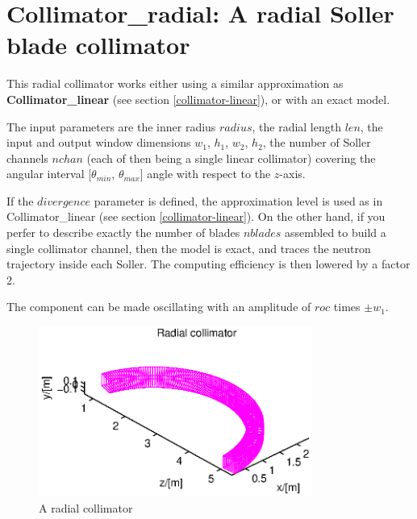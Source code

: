 \section{Collimator\_radial: A radial Soller blade collimator}


This radial collimator works either using a similar approximation as 
{\bf Collimator\_linear} (see section \ref{collimator-linear}), 
or with an exact model.

The input parameters are the inner radius $radius$, the radial length $len$, 
the input and output window dimensions $w_1$, $h_1$, $w_2$, $h_2$, 
the number of Soller channels $nchan$ 
(each of then being a single linear collimator) covering the angular interval
[$\theta_{min}$, $\theta_{max}$] angle with respect to the $z$-axis.

If the $divergence$ parameter is defined, 
the approximation level is used as in {\rm Collimator\_linear} 
(see section \ref{collimator-linear}). 
On the other hand, if you perfer to describe exactly the number of blades 
$nblades$ assembled to build a single collimator channel, 
then the model is exact, and traces the neutron trajectory inside each Soller. 
The computing efficiency is then lowered by a factor 2.

The component can be made oscillating with an amplitude of $roc$ times 
$\pm w_1$.

\begin{figure}
  \begin{center}
    \includegraphics[width=0.8\textwidth]{figures/radial.eps}
  \end{center}
\caption{A radial collimator}
\label{f:coll-radial}
\end{figure}
